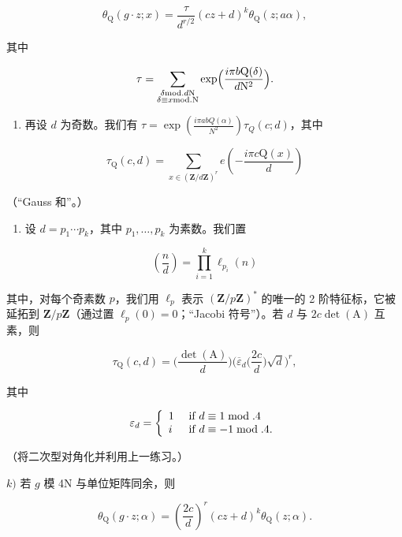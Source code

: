 \[
\theta_ {\mathrm{Q}} (g \cdot z; x) = \frac {\tau}{d ^ {r / 2}} (c z + d) ^ {k} \theta_ {\mathrm{Q}} (z; a \alpha),
\]

其中

\[
\tau = \sum_{\substack{\delta \text{mod.} d\mathrm{N}\\ \delta \equiv x\text{mod.}\mathrm{N}}}\exp \Bigl (\frac{i\pi b\mathrm{Q}(\delta)}{d\mathrm{N}^{2}}\Bigr).
\]

\begin{enumerate}
\def\labelenumi{\roman{enumi})}
\tightlist
\item
  再设 \(d\) 为奇数。我们有 \(\tau = \exp \left(\frac{i\pi abQ(\alpha)}{N^2}\right)\tau_Q(c;d)\)，其中
\end{enumerate}

\[
\tau_ {\mathrm{Q}} (c, d) = \sum_ {x \in (\mathbf {Z} / d \mathbf {Z}) ^ {r}} e \left(- \frac {i \pi c \mathrm{Q} (x)}{d}\right)
\]

（“Gauss 和”。）

\begin{enumerate}
\def\labelenumi{\alph{enumi})}
\setcounter{enumi}{9}
\tightlist
\item
  设 \(d = p_{1} \cdots p_{k}\)，其中 \(p_{1}, \ldots, p_{k}\) 为素数。我们置
\end{enumerate}

\[
\left(\frac {n}{d}\right) = \prod_ {i = 1} ^ {k} \ell_ {p _ {i}} (n)
\]

其中，对每个奇素数 \(p\)，我们用 \(\ell_p\) 表示 \((\mathbf{Z}/p\mathbf{Z})^*\) 的唯一的 2 阶特征标，它被延拓到 \(\mathbf{Z}/p\mathbf{Z}\)（通过置 \(\ell_p(0) = 0\)；“Jacobi 符号”）。若 \(d\) 与 \(2c\det(\mathrm{A})\) 互素，则

\[
\tau_ {\mathrm{Q}} (c, d) = \Big (\frac {\det (\mathrm{A})}{d} \Big) \Big (\overline {{\varepsilon}} _ {d} \Big (\frac {2 c}{d} \Big) \sqrt {d} \Big) ^ {r},
\]

其中

\[
\varepsilon_ {d} = \left\{ \begin{array}{l l} 1 & \text { if } d \equiv 1 \bmod . 4 \\ i & \text { if } d \equiv - 1 \bmod . 4. \end{array} \right.
\]

（将二次型对角化并利用上一练习。）

\(k)\) 若 \(g\) 模 4N 与单位矩阵同余，则

\[
\theta_ {\mathrm{Q}} (g \cdot z; \alpha) = \left(\frac {2 c}{d}\right) ^ {r} (c z + d) ^ {k} \theta_ {\mathrm{Q}} (z; \alpha).
\]

